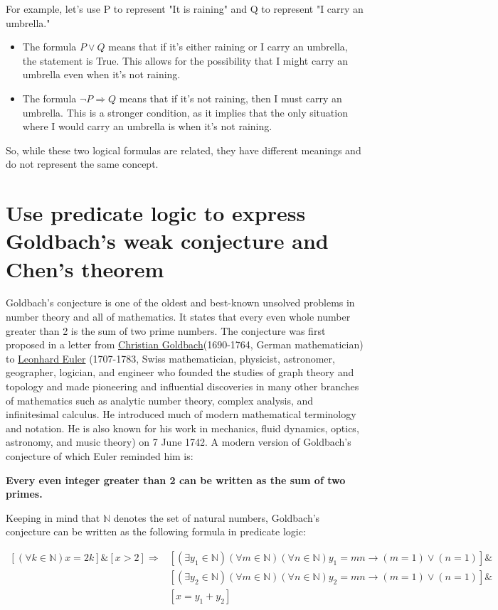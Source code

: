 \documentclass{article}
\begin{document}
For example, let's use P to represent "It is raining" and Q to represent "I carry an umbrella."

\begin{itemize}
  \item The formula $P \lor Q$ means that if it's either raining or I carry an umbrella, the statement is True. This allows for the possibility that I might carry an umbrella even when it's not raining.
  \item The formula $\lnot P \Rightarrow Q$ means that if it's not raining, then I must carry an umbrella. This is a stronger condition, as it implies that the only situation where I would carry an umbrella is when it's not raining.

\end{itemize}

So, while these two logical formulas are related, they have different meanings and do not represent the same concept.


\section{Use predicate logic to express Goldbach's weak conjecture and Chen's theorem}

Goldbach's conjecture is one of the oldest and best-known unsolved problems in number theory and all of mathematics. It states that every even whole number greater than 2 is the sum of two prime numbers. The conjecture was first proposed in a letter from \underline{Christian Goldbach}(1690-1764, German mathematician) to \underline{Leonhard Euler} (1707-1783, Swiss mathematician, physicist, astronomer, geographer, logician, and engineer who founded the studies of graph theory and topology and made pioneering and influential discoveries in many other branches of mathematics such as analytic number theory, complex analysis, and infinitesimal calculus. He introduced much of modern mathematical terminology and notation. He is also known for his work in mechanics, fluid dynamics, optics, astronomy, and music theory) on 7 June 1742. A modern version of Goldbach's conjecture of which Euler reminded him is:

\textbf{Every even integer greater than 2 can be written as the sum of two primes.}

Keeping in mind that $\mathbb{N} $ denotes the set of natural numbers, Goldbach's conjecture can be written as the following formula in predicate logic:

\begin{equation*}
  \begin{aligned}
    [(\forall k \in \mathbb{N})x = 2k]\&[x>2] \Rightarrow &[(\exists y_{1} \in \mathbb{N})(\forall m \in \mathbb{N})(\forall n \in \mathbb{N})y_{1} = mn \longrightarrow (m = 1) \lor (n = 1)]\& \\
    &[(\exists y_{2} \in \mathbb{N})(\forall m \in \mathbb{N})(\forall n \in \mathbb{N})y_{2} = mn \longrightarrow (m = 1) \lor (n = 1)]\& \\
    &[x = y_{1} + y_{2}] 
  \end{aligned}
\end{equation*}
\end{document}
